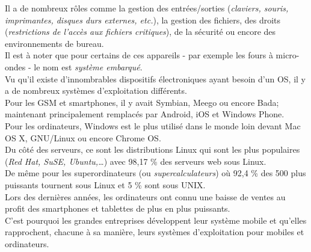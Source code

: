 Il a de nombreux rôles comme la gestion des entrées/sorties (\textit{claviers,
souris, imprimantes, disques durs externes, etc.}), la gestion des fichiers,
des droits (\textit{restrictions de l'accès aux fichiers critiques}), de la
sécurité ou encore des environnements de bureau. \\

Il est à noter que pour certains de ces appareils - par exemple les fours à
micro-ondes - le nom est \textit{système embarqué}. \\

Vu qu'il existe d'innombrables dispositifs électroniques ayant besoin d'un OS,
il y a de nombreux systèmes d'exploitation différents. \\
Pour les GSM et smartphones, il y avait Symbian, Meego ou encore Bada; maintenant
principalement remplacés par Android, iOS et Windows Phone. \\
Pour les ordinateurs, Windows est le plus utilisé dans le monde loin devant
Mac OS X, GNU/Linux ou encore Chrome OS. \\
Du côté des serveurs, ce sont les distributions Linux qui sont les plus populaires
(\textit{Red Hat, SuSE, Ubuntu,…}) avec 98,17 \% des serveurs web sous Linux. \\
De même pour les superordinateurs (ou \textit{supercalculateurs}) où 92,4 \% des
500 plus puissants tournent sous Linux et 5 \% sont sous UNIX. \\

Lors des dernières années, les ordinateurs ont connu une baisse de ventes au
profit des smartphones et tablettes de plus en plus puissants. \\
C'est pourquoi les grandes entreprises développent leur système mobile et qu'elles
rapprochent, chacune à sa manière, leurs systèmes d'exploitation pour mobiles
et ordinateurs.
